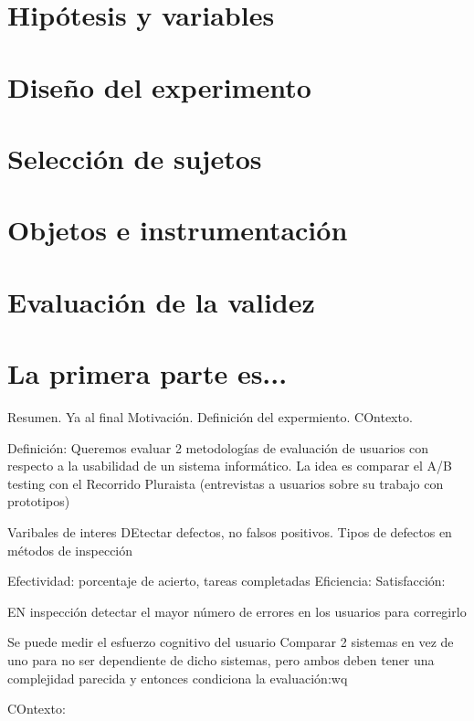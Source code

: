 \documentclass[a4paper,12pt]{report}
\begin{document}
\section{Hipótesis y variables}

\section{Diseño del experimento}

\section{Selección de sujetos}

\section{Objetos e instrumentación}

\section{Evaluación de la validez}





\section{La primera parte es...}
Resumen. Ya al final
Motivación. Definición del expermiento. COntexto. 

Definición: Queremos evaluar 2 metodologías de evaluación de usuarios con respecto a la usabilidad de un sistema informático. La idea es comparar el A/B testing con el Recorrido Pluraista (entrevistas a usuarios sobre su trabajo con prototipos)

Varibales de interes
DEtectar defectos, no falsos positivos. Tipos de defectos en métodos de inspección 

Efectividad: porcentaje de acierto, tareas completadas
Eficiencia:
Satisfacción:

EN inspección detectar el mayor número de errores en los usuarios para corregirlo

Se puede medir el esfuerzo cognitivo del usuario
Comparar 2 sistemas en vez de uno para no ser dependiente de dicho sistemas, pero ambos deben tener una complejidad parecida y entonces condiciona la evaluación:wq


COntexto: 
\end{document}
